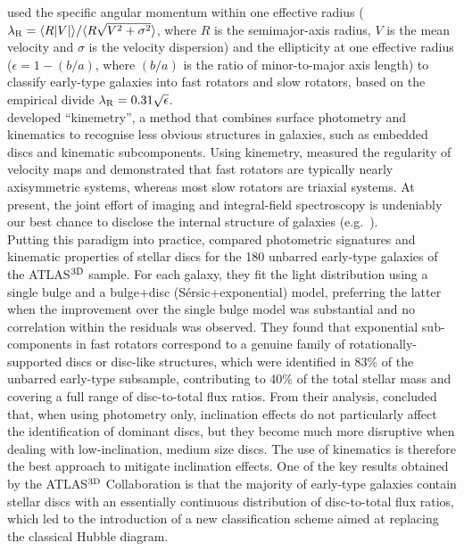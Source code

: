 \cite{emsellem2007} used the specific angular momentum within one effective radius 
($\lambda_{\rm R} = \langle R |V| \rangle / \langle R \sqrt{V^2 + \sigma^2} \rangle $, 
where $R$ is the semimajor-axis radius, $V$ is the mean velocity and $\sigma$ is the velocity dispersion)  
and the ellipticity at one effective radius 
($\epsilon = 1 - (b/a)$, 
where $(b/a)$ is the ratio of minor-to-major axis length) 
to classify early-type galaxies into fast rotators and slow rotators, 
based on the empirical divide $\lambda_{\rm R} = 0.31 \sqrt{\epsilon}$. \\

\cite{krajnovic2006} developed ``kinemetry'', 
a method that combines surface photometry and kinematics 
to recognise less obvious structures in galaxies, such as embedded discs and kinematic subcomponents. 
Using kinemetry, \cite{krajnovic2011} measured the regularity of velocity maps 
and demonstrated that fast rotators are typically nearly axisymmetric systems, 
whereas most slow rotators are triaxial systems. 
At present, the joint effort of imaging and integral-field spectroscopy is undeniably our best chance 
to disclose the internal structure of galaxies (e.g.~\citealt{krajnovic2015IAUS}).  \\

Putting this paradigm into practice, 
\cite{krajnovic2013} compared photometric signatures and kinematic properties of stellar discs 
for the 180 unbarred early-type galaxies of the ATLAS$^{\rm 3D}$ sample. 
For each galaxy, they fit the light distribution using a single bulge \citep{sersic1963,sersic1968} 
and a bulge+disc (S\'ersic+exponential) model, 
preferring the latter when the improvement over the single bulge model was substantial 
and no correlation within the residuals was observed. 
They found that exponential sub-components in fast rotators correspond 
to a genuine family of rotationally-supported discs or disc-like structures, 
which were identified in 83\% of the unbarred early-type subsample,
contributing to 40\% of the total stellar mass and  
covering a full range of disc-to-total flux ratios. 
From their analysis, \cite{krajnovic2013} concluded that, when using photometry only, 
inclination effects do not particularly affect the identification of dominant discs, 
but they become much more disruptive when dealing with low-inclination, medium size discs. 
The use of kinematics is therefore the best approach to mitigate inclination effects. 
One of the key results obtained by the ATLAS$^{\rm 3D}$ Collaboration is that 
the majority of early-type galaxies contain stellar discs 
with an essentially continuous distribution of disc-to-total flux ratios, 
which led \cite{cappellari2011} to the introduction of a new classification scheme 
aimed at replacing the classical Hubble diagram. \\



